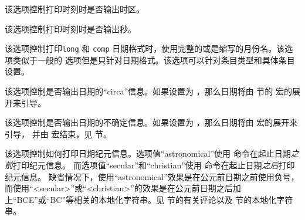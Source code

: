 \begin{optionlist}

该选项控制打印时刻时是否输出时区。


该选项控制打印时刻时是否输出秒。


该选项控制打印\texttt{long} 和 \texttt{comp} 日期格式时，使用完整的或是缩写的月份名。该选项类似于一般的  选项但是只针对日期格式。该选项可以针对条目类型和具体条目设置。


该选项控制是否输出日期的“circa”信息。如果设置为 ，那么日期将由 节的 宏的展开来引导。


该选项控制是否输出日期的不确定信息。如果设置为 ，那么日期将由  宏的展开来引导，
并由  宏结束，见  节。


该选项控制如何打印日期纪元信息。选项值“astronomical”使用  命令在起止日期\emph{之前}打印纪元信息。
而选项值“secular”和“christian”使用  命令在起止日期\emph{之后}打印纪元信息。
缺省情况下，使用“astronomical”效果是在公元前日期之前使用负号，而使用“<secular>”或“<christian>”的效果是在公元前日期之后加上“BCE”或“BC”等相关的本地化字符串。见  节的有关评论以及  节的本地化字符串。


\end{optionlist}
